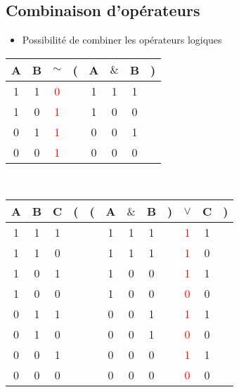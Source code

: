\documentclass[12pt,a4paper]{article}
\begin{document}
	\subsection{Combinaison d'opérateurs}
	
	\begin{itemize}
		\item Possibilité de combiner les opérateurs logiques
	\end{itemize}

	\begin{center}
		\begin{tabular}{@{ }c@{ }@{ }c | c@{ }@{}c@{}@{ }c@{ }@{ }c@{ }@{ }c@{ }@{}c@{ }}
		A & B & $\sim$ & ( & A & $\&$ & B & )\\
		\hline 
		1 & 1 & \textcolor{red}{0} &  & 1 & 1 & 1 & \\
		1 & 0 & \textcolor{red}{1} &  & 1 & 0 & 0 & \\
		0 & 1 & \textcolor{red}{1} &  & 0 & 0 & 1 & \\
		0 & 0 & \textcolor{red}{1} &  & 0 & 0 & 0 & \\
	\end{tabular}
	\end{center}

	\ \\
	\begin{center}
		\begin{tabular}{@{ }c@{ }@{ }c@{ }@{ }c | c@{}@{}c@{}@{ }c@{ }@{ }c@{ }@{ }c@{ }@{}c@{}@{ }c@{ }@{ }c@{ }@{}c@{ }}
			A & B & C & ( & ( & A & $\&$ & B & ) & $\lor$ & C & )\\
			\hline 
			1 & 1 & 1 &  &  & 1 & 1 & 1 &  & \textcolor{red}{1} & 1 & \\
			1 & 1 & 0 &  &  & 1 & 1 & 1 &  & \textcolor{red}{1} & 0 & \\
			1 & 0 & 1 &  &  & 1 & 0 & 0 &  & \textcolor{red}{1} & 1 & \\
			1 & 0 & 0 &  &  & 1 & 0 & 0 &  & \textcolor{red}{0} & 0 & \\
			0 & 1 & 1 &  &  & 0 & 0 & 1 &  & \textcolor{red}{1} & 1 & \\
			0 & 1 & 0 &  &  & 0 & 0 & 1 &  & \textcolor{red}{0} & 0 & \\
			0 & 0 & 1 &  &  & 0 & 0 & 0 &  & \textcolor{red}{1} & 1 & \\
			0 & 0 & 0 &  &  & 0 & 0 & 0 &  & \textcolor{red}{0} & 0 & \\
		\end{tabular}
	\end{center}
	
\end{document}
